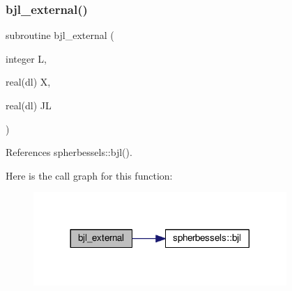 \subsubsection{\texorpdfstring{bjl\+\_\+external()}{bjl\_external()}}
{\footnotesize\ttfamily subroutine bjl\+\_\+external (\begin{DoxyParamCaption}\item[{integer}]{L,  }\item[{real(dl)}]{X,  }\item[{real(dl)}]{JL }\end{DoxyParamCaption})\hspace{0.3cm}{\ttfamily [private]}}



References spherbessels\+::bjl().

Here is the call graph for this function\+:
\nopagebreak
\begin{figure}[H]
\begin{center}
\leavevmode
\includegraphics[width=272pt]{bessels_8f90_ac428f01b558b9ca2410cf327ca24ee7f_cgraph}
\end{center}
\end{figure}

